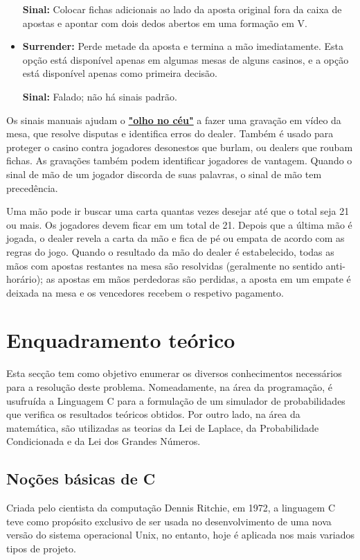 \documentclass{report}
\begin{document}
\begin{itemize}
\newline \textbf{Sinal:} Colocar fichas adicionais ao lado da aposta original fora da caixa de apostas e apontar com dois dedos abertos em uma formação em V.
    \item \hypertarget{Decisões do jogador}{\textbf{Surrender:} Perde metade da aposta e termina a mão imediatamente. Esta opção está disponível apenas em algumas mesas de alguns casinos, e a opção está disponível apenas como primeira decisão.}\newline
\newline \textbf{Sinal:} Falado; não há sinais padrão.\newline
\end{itemize} 


Os sinais manuais ajudam o \hyperlink{Glossário}{\textbf{"olho no céu"}} a fazer uma gravação em vídeo da mesa, que resolve disputas e identifica erros do dealer. Também é usado para proteger o casino contra jogadores desonestos que burlam, ou dealers que roubam fichas. As gravações também podem identificar jogadores de vantagem. Quando o sinal de mão de um jogador discorda de suas palavras, o sinal de mão tem precedência.

Uma mão pode ir buscar uma carta quantas vezes desejar até que o total seja 21 ou mais. Os jogadores devem ficar em um total de 21. Depois que a última mão é jogada, o dealer revela a carta da mão e fica de pé ou empata de acordo com as regras do jogo. Quando o resultado da mão do dealer é estabelecido, todas as mãos com apostas restantes na mesa são resolvidas (geralmente no sentido anti-horário); as apostas em mãos perdedoras são perdidas, a aposta em um empate é deixada na mesa e os vencedores recebem o respetivo pagamento.\cite{rules}






\chapter{Enquadramento teórico}
\label{chap.Enquadramento teórico}
Esta secção tem como objetivo enumerar os diversos conhecimentos necessários para a resolução deste problema. Nomeadamente, na área da programação, é usufruída a Linguagem C para a formulação de um simulador de probabilidades que verifica os resultados teóricos obtidos. Por outro lado, na área da matemática, são utilizadas as teorias da Lei de Laplace, da Probabilidade Condicionada e da Lei dos Grandes Números.

\section{Noções básicas de C}
Criada pelo cientista da computação Dennis Ritchie, em 1972, a linguagem C teve como propósito exclusivo de ser usada no desenvolvimento de uma nova versão do sistema operacional Unix, no entanto, hoje é aplicada nos mais variados tipos de projeto.
\end{document}
